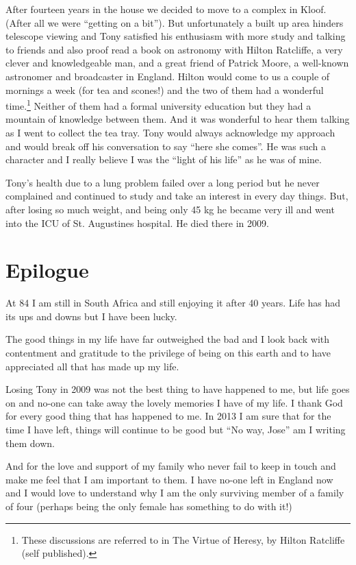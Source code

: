 After fourteen years in the house we decided to move to a complex in
Kloof. (After all we were ``getting on a bit''). But unfortunately a
built up area hinders telescope viewing and Tony satisfied his
enthusiasm with more study and talking to friends and also proof read
a book on astronomy with Hilton Ratcliffe, a very clever and
knowledgeable man, and a great friend of Patrick Moore, a well-known
astronomer and broadcaster in England. Hilton would come to us a
couple of mornings a week (for tea and scones!) and the two of them
had a wonderful time.\footnote{These discussions are referred to in
  The Virtue of Heresy, by Hilton Ratcliffe (self published).} Neither
of them had a formal university education but they had a mountain of
knowledge between them. And it was wonderful to hear them talking as I
went to collect the tea tray.  Tony would always acknowledge my
approach and would break off his conversation to say ``here she
comes''. He was such a character and I really believe I was the
``light of his life'' as he was of mine.

Tony's health due to a lung problem failed over a long period but he
never complained and continued to study and take an interest in every
day things. But, after losing so much weight, and being only 45 kg he
became very ill and went into the ICU of St. Augustines hospital. He
died there in 2009.


\chapter{Epilogue}

At 84 I am still in South Africa and still enjoying it after 40
years. Life has had its ups and downs but I have been lucky.

The good things in my life have far outweighed the bad and I look back
with contentment and gratitude to the privilege of being on this earth
and to have appreciated all that has made up my life.

Losing Tony in 2009 was not the best thing to have happened to me, but
life goes on and no-one can take away the lovely memories I have of my
life. I thank God for every good thing that has happened to me. In
2013 I am sure that for the time I have left, things will continue to
be good but ``No way, Jose'' am I writing them down.

And for the love and support of my family who never fail to keep in
touch and make me feel that I am important to them. I have no-one left
in England now and I would love to understand why I am the only
surviving member of a family of four (perhaps being the only female
has something to do with it!)


